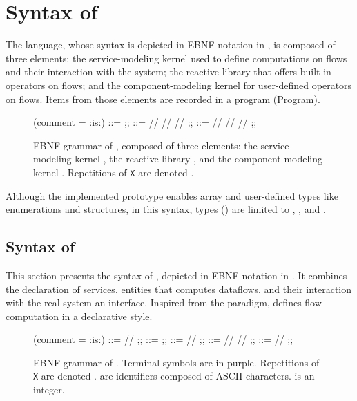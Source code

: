 \section{Syntax of \GRust}
\label{sec:grust:syntax}

The \GRust language, whose syntax is depicted in EBNF notation in , is
composed of three elements: the service-modeling kernel \GRFRP used to define computations on flows
and their interaction with the system; the reactive library \GReact that offers built-in operators
on flows; and the component-modeling kernel \GRSync for user-defined operators on flows. Items from
those elements are recorded in a program (Program).

\begin{figure}[!ht]
    \centering
    \begin{bnf}(comment = {:is:})
        \Prog ::= \many{\Item} ;;
        \Item ::= \InterItem // \ServItem // \FunItem // \CompItem ;;
        \TY   ::= \boolTY // \intTY // \floatTY // \unitTY ;;
    \end{bnf}
    \caption[EBNF grammar of \GRust.]%
    {
        EBNF grammar of \GRust, composed of three elements: the service-modeling kernel \GRFRP, the reactive
        library \GReact, and the component-modeling kernel \GRSync.
        Repetitions of \texttt{X} are denoted .
    }
    \label{fig:syntax:grust}
\end{figure}

Although the implemented prototype enables array and user-defined types like enumerations and
structures, in this syntax, types (\TY) are limited to \boolTY, \intTY, and \floatTY.

\subsection{Syntax of \GRFRP}
\label{sec:grust:syntax:grfrp}

This section presents the syntax of \GRFRP, depicted in EBNF notation in .
It combines the declaration of services, entities that computes dataflows, and their interaction
with the real system \via an interface. Inspired from the \frp paradigm, \GRFRP defines flow
computation in a declarative style.

\begin{figure}[!ht]
    \centering
    \begin{bnf}(comment = {:is:})
        \InterItem ::= \importX{\typed{\FlowKind}{\ID}{\TY}} // \exportX{\typed{\FlowKind}{\ID}{\TY}} ;;
        \ServItem ::= \servItem{\ID}{\interval{\INT}{\INT}}{\many{\FlowStmt}} ;;
        \FlowStmt ::=  //  ;;
        \FlowOp ::= \ID // \compApp{\ID}{\many{\FlowOp}} // \GReactExpr ;;
        \FlowKind ::= \signalKind // \eventKind ;;
    \end{bnf}
    \caption[EBNF grammar of \GRFRP.]%
    {EBNF grammar of \GRFRP.
        Terminal symbols are in purple.
        Repetitions of \texttt{X} are denoted .
        \ID are identifiers composed of ASCII characters.
        \INT is an integer.}
    \label{fig:syntax:grfrp}
\end{figure}

